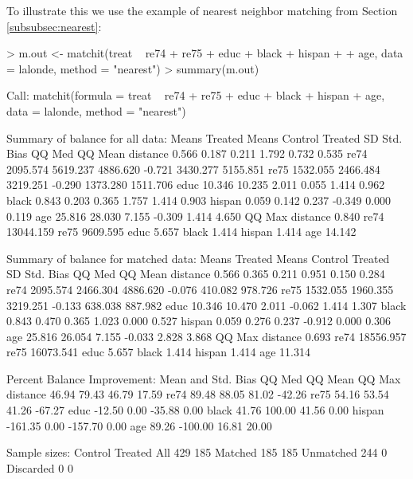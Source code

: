 \documentclass[oneside,letterpaper,titlepage]{article}
\begin{document}
  To illustrate this we use the example of nearest neighbor matching
  from Section \ref{subsubsec:nearest}:
\begin{Schunk}
\begin{Sinput}
> m.out <- matchit(treat ~ re74 + re75 + educ + black + hispan + 
+     age, data = lalonde, method = "nearest")
> summary(m.out)
\end{Sinput}
\begin{Soutput}
Call:
matchit(formula = treat ~ re74 + re75 + educ + black + hispan + 
    age, data = lalonde, method = "nearest")

Summary of balance for all data:
         Means Treated Means Control Treated SD Std. Bias   QQ Med  QQ Mean
distance         0.566         0.187      0.211     1.792    0.732    0.535
re74          2095.574      5619.237   4886.620    -0.721 3430.277 5155.851
re75          1532.055      2466.484   3219.251    -0.290 1373.280 1511.706
educ            10.346        10.235      2.011     0.055    1.414    0.962
black            0.843         0.203      0.365     1.757    1.414    0.903
hispan           0.059         0.142      0.237    -0.349    0.000    0.119
age             25.816        28.030      7.155    -0.309    1.414    4.650
            QQ Max
distance     0.840
re74     13044.159
re75      9609.595
educ         5.657
black        1.414
hispan       1.414
age         14.142


Summary of balance for matched data:
         Means Treated Means Control Treated SD Std. Bias  QQ Med QQ Mean
distance         0.566         0.365      0.211     0.951   0.150   0.284
re74          2095.574      2466.304   4886.620    -0.076 410.082 978.726
re75          1532.055      1960.355   3219.251    -0.133 638.038 887.982
educ            10.346        10.470      2.011    -0.062   1.414   1.307
black            0.843         0.470      0.365     1.023   0.000   0.527
hispan           0.059         0.276      0.237    -0.912   0.000   0.306
age             25.816        26.054      7.155    -0.033   2.828   3.868
            QQ Max
distance     0.693
re74     18556.957
re75     16073.541
educ         5.657
black        1.414
hispan       1.414
age         11.314

Percent Balance Improvement:
         Mean and Std. Bias  QQ Med QQ Mean QQ Max
distance              46.94   79.43   46.79  17.59
re74                  89.48   88.05   81.02 -42.26
re75                  54.16   53.54   41.26 -67.27
educ                 -12.50    0.00  -35.88   0.00
black                 41.76  100.00   41.56   0.00
hispan              -161.35    0.00 -157.70   0.00
age                   89.26 -100.00   16.81  20.00

Sample sizes:
          Control Treated
All           429     185
Matched       185     185
Unmatched     244       0
Discarded       0       0
\end{Soutput}
\end{Schunk}
\end{document}
